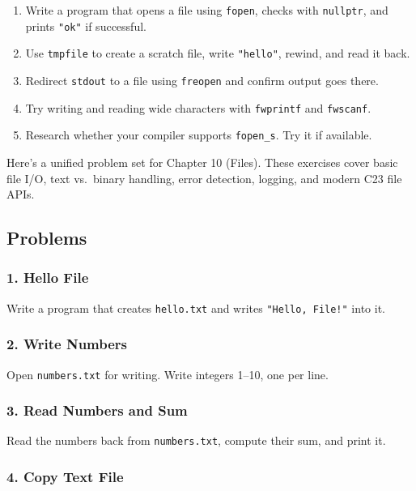 \documentclass[
  letterpaper,
  DIV=11,
  numbers=noendperiod]{scrreprt}
\providecommand{\tightlist}{%
  \setlength{\itemsep}{0pt}\setlength{\parskip}{0pt}}
\begin{document}
\begin{enumerate}
\def\labelenumi{\arabic{enumi}.}
\tightlist
\item
  Write a program that opens a file using \texttt{fopen}, checks with
  \texttt{nullptr}, and prints \texttt{"ok"} if successful.
\item
  Use \texttt{tmpfile} to create a scratch file, write \texttt{"hello"},
  rewind, and read it back.
\item
  Redirect \texttt{stdout} to a file using \texttt{freopen} and confirm
  output goes there.
\item
  Try writing and reading wide characters with \texttt{fwprintf} and
  \texttt{fwscanf}.
\item
  Research whether your compiler supports \texttt{fopen\_s}. Try it if
  available.
\end{enumerate}

Here's a unified problem set for Chapter 10 (Files). These exercises
cover basic file I/O, text vs.~binary handling, error detection,
logging, and modern C23 file APIs.

\subsection{Problems}\label{problems-8}

\subsubsection{1. Hello File}\label{hello-file}

Write a program that creates \texttt{hello.txt} and writes
\texttt{"Hello,\ File!"} into it.

\subsubsection{2. Write Numbers}\label{write-numbers}

Open \texttt{numbers.txt} for writing. Write integers 1--10, one per
line.

\subsubsection{3. Read Numbers and Sum}\label{read-numbers-and-sum}

Read the numbers back from \texttt{numbers.txt}, compute their sum, and
print it.

\subsubsection{4. Copy Text File}\label{copy-text-file}
\end{document}
